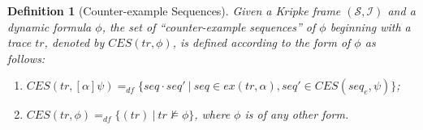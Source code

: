 \documentclass[manuscript,screen]{acmart}
\newtheorem{definition}{Definition}[section]
\newcommand{\mcl}[1]{\mathcal{#1}}
\newcommand{\dddef}[0]{=_{df}}
\newcommand{\EX}[0]{\textit{CES}}
\newcommand{\ex}[0]{\textit{ex}}
\newcommand{\Wd}[0]{\mcl{S}}
\newcommand{\I}[0]{\mcl{I}}
\DeclareMathOperator{\osuf}{\mathbf{suf}}
\DeclareMathOperator{\ofus}{\mathbf{fus}}
\begin{document}
\begin{definition}[Counter-example Sequences]
    \label{def:Minimum Counter-example Traces}
Given a Kripke frame $(\Wd, \I)$ and a dynamic formula $\phi$, the set of ``counter-example sequences'' of $\phi$ beginning with a trace $tr$, denoted by $\EX(tr, \phi)$, is defined according to the form of $\phi$ as follows: 
    \begin{enumerate}
        \item $\EX(tr, [\alpha]\psi)\dddef \{seq\cdot seq'\ |\ seq\in \ex(tr, \alpha), seq'\in \EX(seq_e, \psi)\}$;
        \item $\EX(tr, \phi)\dddef \{(tr)\ |\ tr\not\models \phi\}$, where $\phi$ is of any other form. 
    \end{enumerate}
\end{definition}
\end{document}
